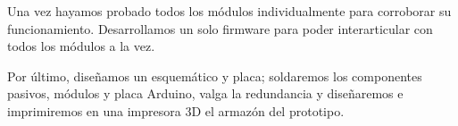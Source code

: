 \par \noindent
Una vez hayamos probado todos los módulos individualmente para corroborar su funcionamiento. Desarrollamos un solo firmware para poder interarticular con todos los módulos a la vez. 

\par \noindent
Por último, diseñamos un esquemático y placa; soldaremos los componentes pasivos, módulos y placa Arduino, valga la redundancia y diseñaremos e imprimiremos en una impresora 3D el armazón del prototipo.





